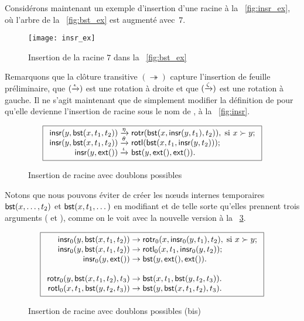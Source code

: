 Considérons maintenant un exemple d'insertion d'une racine à la
\fig~\vref{fig:insr_ex}, où l'arbre de la \fig~\vref{fig:bst_ex} est
augmenté avec~\(7\).
\begin{figure}[b]
\centering
\texttt{[image: insr\_ex]}%
\caption{Insertion de la racine \(7\) dans la \fig~\vref{fig:bst_ex}}
\label{fig:insr_ex}
\end{figure}
Remarquons que la clôture transitive \((\twoheadrightarrow)\) capture
l'insertion de feuille préliminaire, que
\((\xrightarrow{\smash{\epsilon}})\) est une rotation à droite et que
\((\xrightarrow{\smash{\zeta}})\) est une rotation à gauche. Il ne
s'agit maintenant que de simplement modifier la définition de
 pour qu'elle devienne l'insertion de racine sous le nom
de , à la \fig~\vref{fig:insr}.
\begin{figure}
\begin{equation*}
\boxed{
\begin{array}{r@{\;}l@{\;}l}
\fun{insr}(y,\fun{bst}(x,t_1,t_2)) & \xrightarrow{\smash{\eta}} &
  \fun{rotr}(\fun{bst}(x,\fun{insr}(y,t_1),t_2)),
  \; \text{si \(x \succ y\)};\\
\fun{insr}(y,\fun{bst}(x,t_1,t_2)) & \xrightarrow{\smash{\theta}} &
  \fun{rotl}(\fun{bst}(x,t_1,\fun{insr}(y,t_2)));\\
\fun{insr}(y,\fun{ext}()) & \xrightarrow{\smash{\iota}} & \fun{bst}(y,\fun{ext}(),\fun{ext}()).
\end{array}}
\end{equation*}
\caption{Insertion de racine avec doublons possibles}
\label{fig:insr}
\end{figure}
Notons que nous pouvons éviter de créer les nœuds internes
temporaires \(\textsf{bst}(x,\dots,t_2)\) et \(\textsf{bst}(x,t_1,\dots)\)
en modifiant  et  de telle sorte qu'elles
prennent trois arguments ( et ),
comme on le voit avec la nouvelle version  à la
\fig~\ref{fig:insr0}.
\begin{figure}
\begin{equation*}
\boxed{
\begin{array}{r@{\;}l@{\;}l}
\fun{insr}_0(y,\fun{bst}(x,t_1,t_2)) & \rightarrow &
  \fun{rotr}_0(x,\fun{insr}_0(y,t_1),t_2),
  \; \text{si \(x \succ y\)};\\
\fun{insr}_0(y,\fun{bst}(x,t_1,t_2)) & \rightarrow &
  \fun{rotl}_0(x,t_1,\fun{insr}_0(y,t_2));\\
\fun{insr}_0(y,\fun{ext}()) & \rightarrow &
\fun{bst}(y,\fun{ext}(),\fun{ext}()).\\
\\
\fun{rotr}_0(y,\fun{bst}(x,t_1,t_2),t_3)
& \rightarrow & \fun{bst}(x,t_1,\fun{bst}(y,t_2,t_3)).\\
\fun{rotl}_0(x,t_1,\fun{bst}(y,t_2,t_3))
& \rightarrow & \fun{bst}(y,\fun{bst}(x,t_1,t_2),t_3).
\end{array}}
\end{equation*}
\caption{Insertion de racine avec doublons possibles (bis)}
\label{fig:insr0}
\end{figure}

